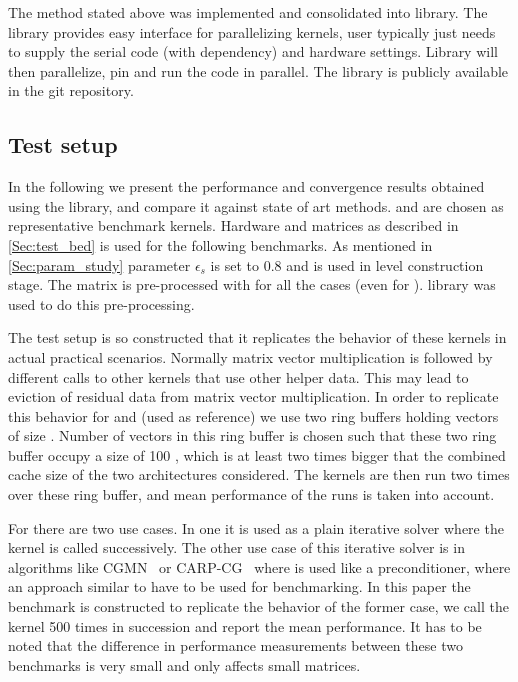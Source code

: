 The method stated above was implemented and consolidated into \RACE library. The library provides easy interface for parallelizing kernels, user typically just needs to supply the serial code (with dependency) and hardware settings. Library will then parallelize, pin and run the code in parallel. The library is publicly available in the git repository. %

\subsection{Test setup}
In the following we present the performance and convergence results obtained using the library, and compare it against state of art methods. \SymmSpmv and \SYMMKACZ are chosen as representative benchmark kernels. Hardware and matrices as described in \cref{Sec:test_bed} is used for the following benchmarks. As mentioned in \cref{Sec:param_study} parameter $\epsilon_s$ is set to 0.8 and \RCM is used in level construction stage. The matrix is pre-processed with \RCM for all the cases (even for \SpMV). \SPMP \cite{SpMP} library was used to do this \RCM pre-processing.

The test setup is so constructed that it replicates the behavior of these kernels in actual practical scenarios. Normally matrix vector multiplication is followed by different calls to other kernels that use other helper data. This may lead to eviction of residual data from matrix vector multiplication. In order to replicate this behavior for \SymmSpmv and \SpMV (used as reference) we use  two ring buffers holding vectors of size \nrows. Number of vectors in this ring buffer is chosen such that these two ring buffer occupy a size of 100 \MB, which is at least two times bigger that the combined cache size of the two architectures considered. The kernels are then run two times over these ring buffer, and mean performance of the runs is taken into account.

For \SYMMKACZ there are two use cases. In one it is used as a plain iterative solver where the kernel is called successively. The other use case of this iterative solver is in algorithms like CGMN~\cite{CGMN, CGMN_gordon} or CARP-CG~\cite{CARP-CG} where \SYMMKACZ is used like a preconditioner, where an approach similar to \SymmSpmv have to be used for benchmarking. In this paper the benchmark is constructed to replicate the behavior of the former case, \ie we call the \SYMMKACZ kernel 500 times in succession and report the mean performance. It has to be noted that the difference in performance measurements between these two benchmarks is very small and only affects small matrices.


